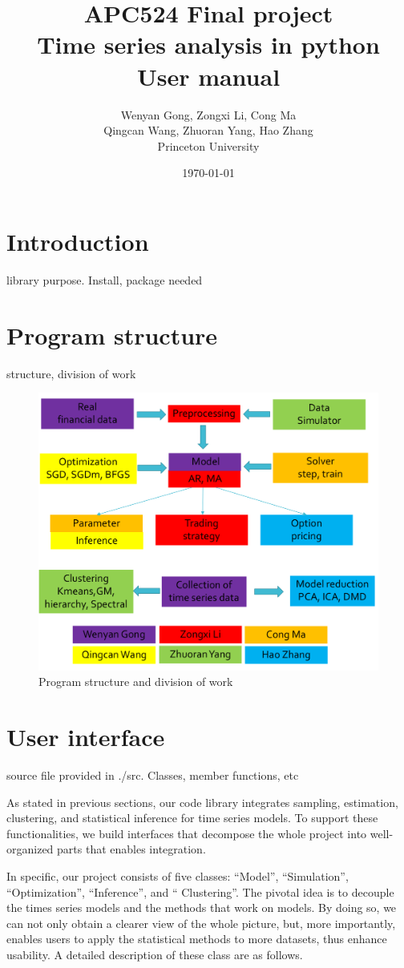 \documentclass[12pt,a4paper]{article}
\title{APC524 Final project
\\Time series analysis in python
\\User manual}
\author{Wenyan Gong, Zongxi Li, Cong Ma
\\Qingcan Wang, Zhuoran Yang, Hao Zhang
\\Princeton University}
\date{\today}
\begin{document}
\maketitle

\section{Introduction}
library purpose. Install, package needed

\section{Program structure}
structure, division of work
\begin{figure}[H]
        \centering
     \includegraphics[width=.5\linewidth]{./Figure/structure.png}
\caption{Program structure and division of work}
\end{figure}
\section{User interface}
source file provided in ./src. Classes, member functions, etc

As stated in previous sections, our code library integrates sampling, estimation, clustering, and statistical inference for time series models. To support these functionalities, we build interfaces that decompose the whole project into well-organized parts that enables integration.

In specific, our project consists of five classes: “Model”, “Simulation”, “Optimization”, “Inference”, and “ Clustering”. The pivotal idea is to decouple the times series models and the methods that work on models. By doing so, we can not only obtain a clearer view of the whole picture, but, more importantly, enables users to apply the statistical methods to more datasets, thus enhance usability. A detailed description of these class are as follows.
\end{document}
